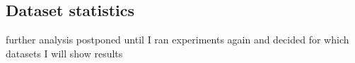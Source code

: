 \subsection{Dataset statistics} \label{subsec:datasetstatistics}

further analysis postponed until I ran experiments again and decided for which datasets I will show results 


